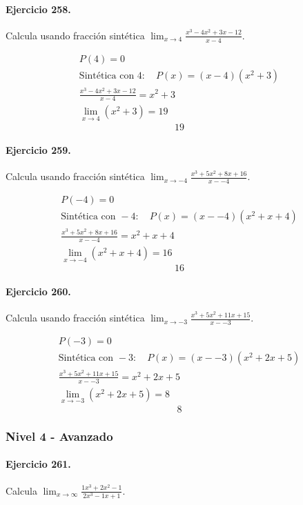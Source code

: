 \documentclass[11pt,a4paper]{article}
\begin{document}
\paragraph{Ejercicio 258.} Calcula usando fracción sintética $\displaystyle\lim_{x\to 4}\frac{x^3 - 4x^2 + 3x - 12}{x-4}$. 

\[
\begin{aligned}
P(4)=0\\
\text{Sintética con }4:\quad P(x)=(x-4)(x^2 + 3)\\
\frac{x^3 - 4x^2 + 3x - 12}{x-4}=x^2 + 3\\
\lim_{x\to 4}(x^2 + 3)=19
\end{aligned}
\]
\[\boxed{19}\]


\paragraph{Ejercicio 259.} Calcula usando fracción sintética $\displaystyle\lim_{x\to -4}\frac{x^3 + 5x^2 + 8x + 16}{x--4}$. 

\[
\begin{aligned}
P(-4)=0\\
\text{Sintética con }-4:\quad P(x)=(x--4)(x^2 + x + 4)\\
\frac{x^3 + 5x^2 + 8x + 16}{x--4}=x^2 + x + 4\\
\lim_{x\to -4}(x^2 + x + 4)=16
\end{aligned}
\]
\[\boxed{16}\]


\paragraph{Ejercicio 260.} Calcula usando fracción sintética $\displaystyle\lim_{x\to -3}\frac{x^3 + 5x^2 + 11x + 15}{x--3}$. 

\[
\begin{aligned}
P(-3)=0\\
\text{Sintética con }-3:\quad P(x)=(x--3)(x^2 + 2x + 5)\\
\frac{x^3 + 5x^2 + 11x + 15}{x--3}=x^2 + 2x + 5\\
\lim_{x\to -3}(x^2 + 2x + 5)=8
\end{aligned}
\]
\[\boxed{8}\]


\newpage

\subsubsection*{Nivel 4 - Avanzado}

\paragraph{Ejercicio 261.} Calcula $\displaystyle\lim_{x\to\infty}\frac{1x^3+2x^2-1}{2x^3-1x+1}$. 
\end{document}
